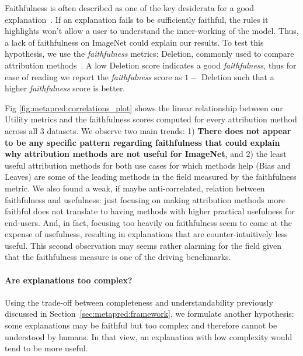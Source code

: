 Faithfulness is often described as one of the key desiderata for a good explanation~\cite{aggregating2020,yeh2019infidelity,fel2020representativity}. If an explanation fails to be sufficiently faithful, the rules it highlights won't allow a user to understand the inner-working of the model. Thus, a lack of faithfulness on ImageNet could explain our results. 
To test this hypothesis, we use the  {\em faithfulness} metrics: Deletion\cite{samek2015evaluating, petsiuk2018rise},  commonly used to compare attribution methods~\cite{samek2015evaluating, petsiuk2018rise, fel2021sobol, fong2017perturbation, fong2019extremal, kapishnikov2019xrai}. A low Deletion score indicates a good {\em faithfulness}, thus for ease of reading we report the  {\em faithfulness} score as $1 -$ Deletion such that a higher {\em faithfulness} score is better. 

Fig \ref{fig:metapred:correlations_plot} shows the linear relationship between our Utility metrics and the faithfulness scores computed for every attribution method across all 3 datasets. We observe two main trends: 1) \textbf{There does not appear to be any specific pattern regarding faithfulness  that could explain why attribution methods are not useful for ImageNet}, and 2) the least useful attribution methods for both use cases for which methods help (Bias and Leaves) are some of the leading methods in the field measured by the faithfulness metric.
We also found a weak, if maybe anti-correlated, relation between faithfulness and usefulness: just focusing on making attribution methods more faithful does not translate to having methods with higher practical usefulness for end-users. And, in fact, focusing too heavily on faithfulness seem to come at the expense of usefulness, resulting in explanations that are counter-intuitively less useful. This second observation may seems rather alarming for the field given that the faithfulness measure is one of the driving benchmarks.


\paragraph{Are explanations too complex?} 

Using the trade-off between completeness and understandability previously discussed in Section~\ref{sec:metapred:framework}, we formulate another hypothesis: some explanations may be faithful  but too complex and therefore cannot be understood by humans. In that view, an explanation with low complexity would tend to be more useful.

